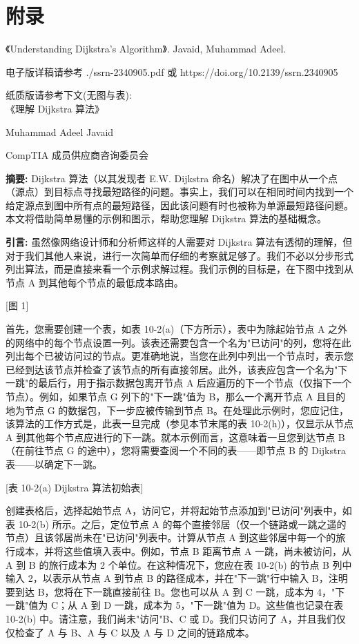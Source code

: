 \documentclass[12pt,a4paper,oneside,UTF8]{ctexart}
\begin{document}
\newpage\section{附录}
《Understanding Dijkstra's Algorithm》. Javaid, Muhammad Adeel. 

电子版详稿请参考 ./ssrn-2340905.pdf 或 https://doi.org/10.2139/ssrn.2340905

纸质版请参考下文(无图与表):
~\\

《理解 Dijkstra 算法》

Muhammad Adeel Javaid

CompTIA 成员供应商咨询委员会

{\bf 摘要:}
Dijkstra 算法（以其发现者 E.W. Dijkstra 命名）解决了在图中从一个点（源点）到目标点寻找最短路径的问题。事实上，我们可以在相同时间内找到一个给定源点到图中所有点的最短路径，因此该问题有时也被称为单源最短路径问题。本文将借助简单易懂的示例和图示，帮助您理解 Dijkstra 算法的基础概念。

{\bf 引言:}
虽然像网络设计师和分析师这样的人需要对 Dijkstra 算法有透彻的理解，但对于我们其他人来说，进行一次简单而仔细的考察就足够了。我们不必以分步形式列出算法，而是直接来看一个示例求解过程。我们示例的目标是，在下图中找到从节点 A 到其他每个节点的最低成本路由。

[图 1]

首先，您需要创建一个表，如表 10-2(a)（下方所示），表中为除起始节点 A 之外的网络中的每个节点设置一列。该表还需要包含一个名为"已访问"的列，您将在此列出每个已被访问过的节点。更准确地说，当您在此列中列出一个节点时，表示您已经到达该节点并检查了该节点的所有直接邻居。此外，该表应包含一个名为"下一跳"的最后行，用于指示数据包离开节点 A 后应遍历的下一个节点（仅指下一个节点）。例如，如果节点 G 列下的"下一跳"值为 B，那么一个离开节点 A 且目的地为节点 G 的数据包，下一步应被传输到节点 B。在处理此示例时，您应记住，该算法的工作方式是，此表一旦完成（参见本节末尾的表 10-2(h)），仅显示从节点 A 到其他每个节点应进行的下一跳。就本示例而言，这意味着一旦您到达节点 B（在前往节点 G 的途中），您将需要查阅一个不同的表——即节点 B 的 Dijkstra 表——以确定下一跳。

[表 10-2(a) Dijkstra 算法初始表]

创建表格后，选择起始节点 A，访问它，并将起始节点添加到"已访问"列表中，如表 10-2(b) 所示。之后，定位节点 A 的每个直接邻居（仅一个链路或一跳之遥的节点）且该邻居尚未在"已访问"列表中。计算从节点 A 到这些邻居中每一个的旅行成本，并将这些值填入表中。例如，节点 B 距离节点 A 一跳，尚未被访问，从 A 到 B 的旅行成本为 2 个单位。在这种情况下，您应在表 10-2(b) 的节点 B 列中输入 2，以表示从节点 A 到节点 B 的路径成本，并在"下一跳"行中输入 B，注明要到达 B，您将在下一跳直接前往 B。您也可以从 A 到 C 一跳，成本为 4，"下一跳"值为 C；从 A 到 D 一跳，成本为 5，"下一跳"值为 D。这些值也记录在表 10-2(b) 中。请注意，我们尚未"访问"B、C 或 D。我们只访问了 A，并且我们仅仅检查了 A 与 B、A 与 C 以及 A 与 D 之间的链路成本。
\end{document}
